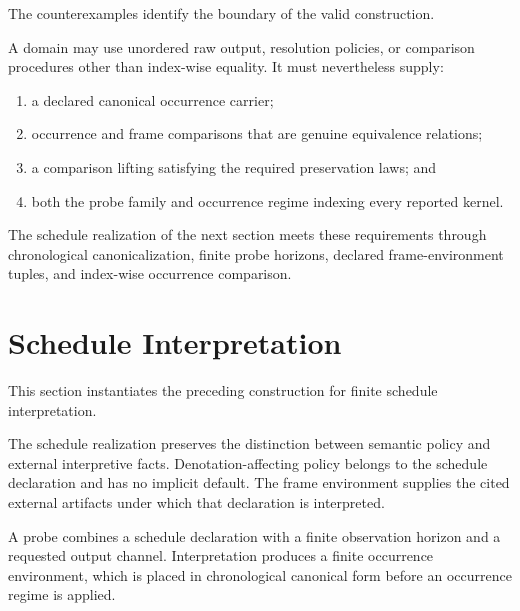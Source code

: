 \documentclass[11pt]{article}
\theoremstyle{plain}
\theoremstyle{definition}
\theoremstyle{remark}
\begin{document}
The counterexamples identify the boundary
of the valid construction.

A domain may use unordered raw output,
resolution policies,
or comparison procedures other than index-wise equality.
It must nevertheless supply:

\begin{enumerate}[label=(\alph*)]
  \item a declared canonical occurrence carrier;
  \item occurrence and frame comparisons
        that are genuine equivalence relations;
  \item a comparison lifting
        satisfying the required preservation laws; and
  \item both the probe family
        and occurrence regime
        indexing every reported kernel.
\end{enumerate}

The schedule realization of the next section
meets these requirements
through chronological canonicalization,
finite probe horizons,
declared frame-environment tuples,
and index-wise occurrence comparison.


\section{Schedule Interpretation}
\label{ik.sec.schedule-interpretation}

This section instantiates the preceding construction
for finite schedule interpretation.

The schedule realization preserves the distinction
between semantic policy and external interpretive facts.
Denotation-affecting policy belongs to the schedule declaration
and has no implicit default.
The frame environment supplies the cited external artifacts
under which that declaration is interpreted.

A probe combines a schedule declaration
with a finite observation horizon
and a requested output channel.
Interpretation produces a finite occurrence environment,
which is placed in chronological canonical form
before an occurrence regime is applied.
\end{document}
